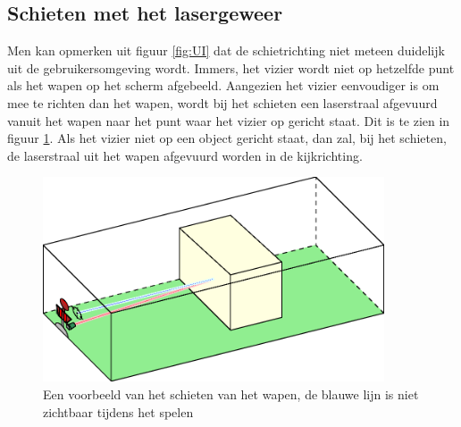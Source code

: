 \subsection{Schieten met het lasergeweer}
Men kan opmerken uit figuur \ref{fig:UI} dat de schietrichting niet meteen duidelijk uit de gebruikersomgeving wordt. Immers, het vizier wordt niet op hetzelfde punt als het wapen op het scherm afgebeeld. Aangezien het vizier eenvoudiger is om mee te richten dan het wapen, wordt bij het schieten een laserstraal afgevuurd vanuit het wapen naar het punt waar het vizier op gericht staat. Dit is te zien in figuur \ref{fig:COL}. Als het vizier niet op een object gericht staat, dan zal, bij het schieten, de laserstraal uit het wapen afgevuurd worden in de kijkrichting.

\begin{figure}[H]
\includegraphics[width=0.9\textwidth]{Graphics/Collision.eps}
\caption{Een voorbeeld van het schieten van het wapen, de blauwe lijn is niet zichtbaar tijdens het spelen}
\label{fig:COL}
\end{figure}

